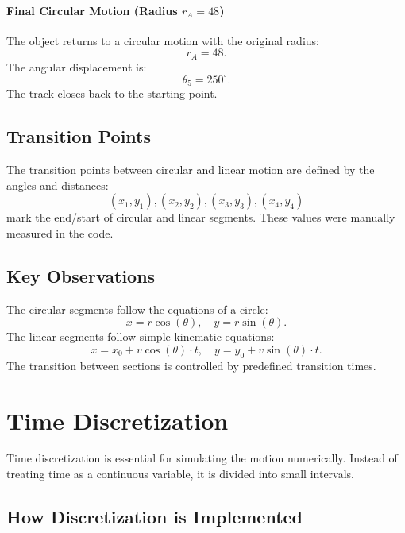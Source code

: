 \documentclass{article}
\begin{document}
\paragraph{Final Circular Motion (Radius $r_A = 48$)}
The object returns to a circular motion with the original radius:
\begin{equation}
r_A = 48.
\end{equation}
The angular displacement is:
\begin{equation}
\theta_5 = 250^\circ.
\end{equation}
The track closes back to the starting point.

\subsection*{Transition Points}
The transition points between circular and linear motion are defined by the angles and distances:
\begin{equation}
(x_1, y_1), (x_2, y_2), (x_3, y_3), (x_4, y_4)
\end{equation}
mark the end/start of circular and linear segments. These values were manually measured in the code.

\subsection*{Key Observations}
The circular segments follow the equations of a circle:
\begin{equation}
    x = r \cos(\theta), \quad y = r \sin(\theta).
\end{equation}
The linear segments follow simple kinematic equations:
\begin{equation}
    x = x_0 + v \cos(\theta) \cdot t, \quad y = y_0 + v \sin(\theta) \cdot t.
\end{equation}
The transition between sections is controlled by predefined transition times.

\section*{Time Discretization}
Time discretization is essential for simulating the motion numerically. Instead of treating time as a continuous variable, it is divided into small intervals.

\subsection*{How Discretization is Implemented}
\end{document}
